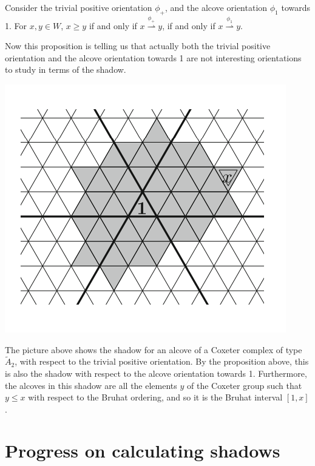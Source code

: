 \documentclass[11pt]{article}
\begin{document}
\begin{proposition}
    Consider the trivial positive orientation $\phi_+$, and the alcove orientation $\phi_1$ towards 1. For $x,y\in W$, $x\geq y$ if and only if $x\stackrel{\phi_+}{\rightharpoonup} y$, if and only if $x\stackrel{\phi_1}{\rightharpoonup} y$.
\end{proposition}

Now this proposition is telling us that actually both the trivial positive orientation and the alcove orientation towards 1 are not interesting orientations to study in terms of the shadow. 

\begin{center}
    \includegraphics[scale=1]{Screenshot 2023-03-07 133912.png}\\
\end{center}


\begin{example}
    The picture above shows the shadow for an alcove of a Coxeter complex of type $\tilde{A}_2$, with respect to the trivial positive orientation. By the proposition above, this is also the shadow with respect to the alcove orientation towards 1. Furthermore, the alcoves in this shadow are all the elements $y$ of the Coxeter group such that $y\leq x$ with respect to the Bruhat ordering, and so it is the Bruhat interval $[1,x]$. 
\end{example}


\section{Progress on calculating shadows}
\end{document}
